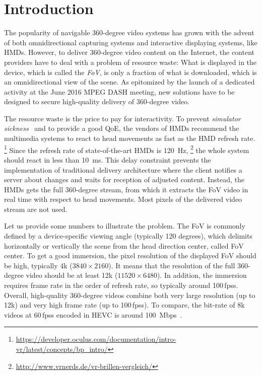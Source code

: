\section{Introduction}
\label{sec:introduction}


The popularity of navigable 360-degree video systems
has grown with the advent of both omnidirectional capturing systems
and interactive displaying
systems, like \acp{HMD}.
However, to deliver 360-degree video content on the Internet, the content providers 
have to deal with a problem of resource waste: What is displayed in the device,
which is called the \textit{\ac{FoV}}, is only a fraction of what is downloaded, which is an omnidirectional view of the scene.
As epitomized by the launch of a dedicated activity at the June 2016 MPEG \ac{DASH} meeting, 
new solutions have to be designed to secure high-quality delivery of 360-degree video.

The resource waste is the price to pay for interactivity.
To prevent \emph{simulator sickness}~\cite{moss2011characteristics}
and to provide a good \ac{QoE}, the vendors of \acp{HMD} recommend the multimedia
systems to react
to head movements as fast as the \ac{HMD}
refresh rate.%
\footnote{\url{https://developer.oculus.com/documentation/intro-vr/latest/concepts/bp_intro/}}
Since the refresh rate of
state-of-the-art \acp{HMD} is \SI{120}{Hz},%
\footnote{\url{http://www.vrnerds.de/vr-brillen-vergleich/}}
the whole system should react in less than
\SI{10}{ms}. This delay constraint prevents the implementation of traditional delivery
architecture where the client notifies a server about changes and waits for reception
of adjusted content. Instead, the \acp{HMD} gets the full 360-degree stream, from which
it extracts the \ac{FoV} video in real time with respect to head movements. Most pixels
of the delivered video stream are not used.

Let us provide some numbers to illustrate the problem.
The \ac{FoV} is commonly defined by
a device-specific viewing angle (typically 120 degrees), which delimits horizontally or
vertically the scene from the head direction center, called \ac{FoV} center. To get a good
immersion, the pixel
resolution of
the displayed \ac{FoV} should be high, typically 4k ($3840\times2160$). It means that
the resolution of the full 360-degree video should be at least 12k ($11520\times6480$).
In addition, the immersion requires frame rate in the order of refresh rate, so
typically around 100\,\acp{fps}.
Overall, high-quality 360-degree videos combine both very large resolution (up to 12k)
and very high frame rate (up to 100\,\acp{fps}). To compare, the bit-rate of 8k videos
at 60\,\acp{fps} encoded in \ac{HEVC} is around \SI{100}{Mbps}~\cite{7398367}.



